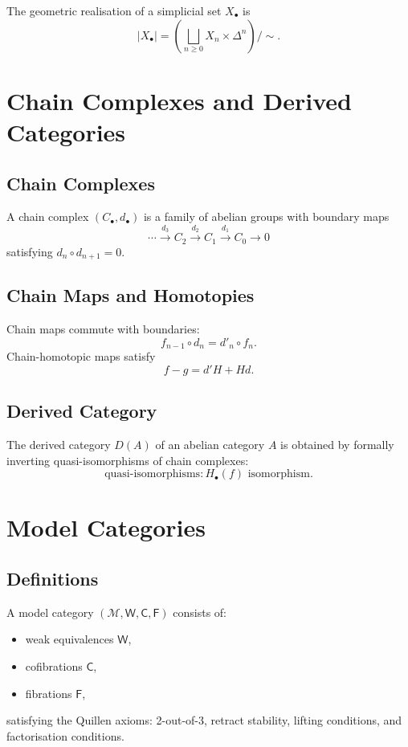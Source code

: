 The geometric realisation of a simplicial set $X_\bullet$ is
\[
|X_\bullet|
  = \left( \bigsqcup_{n\ge 0} X_n \times \Delta^n \right) / \sim.
\]

\section{Chain Complexes and Derived Categories}

\subsection{Chain Complexes}

A chain complex $(C_\bullet,d_\bullet)$ is a family of abelian groups with boundary maps
\[
\cdots \xrightarrow{d_3} C_2 \xrightarrow{d_2} C_1 \xrightarrow{d_1} C_0 \to 0
\]
satisfying $d_{n} \circ d_{n+1} = 0$.

\subsection{Chain Maps and Homotopies}

Chain maps commute with boundaries:
\[
f_{n-1}\circ d_n = d'_n\circ f_n.
\]
Chain-homotopic maps satisfy
\[
f - g = d'H + Hd.
\]

\subsection{Derived Category}

The derived category $D(A)$ of an abelian category $A$ is obtained by formally inverting quasi-isomorphisms of chain complexes:
\[
\text{quasi-isomorphisms} :
H_\bullet(f) \text{ isomorphism}.
\]

\section{Model Categories}

\subsection{Definitions}

A model category $(\mathcal{M},\mathsf{W},\mathsf{C},\mathsf{F})$ consists of:
\begin{itemize}
\item weak equivalences $\mathsf{W}$,
\item cofibrations $\mathsf{C}$,
\item fibrations $\mathsf{F}$,
\end{itemize}
satisfying the Quillen axioms:
2-out-of-3, retract stability, lifting conditions, and factorisation conditions.

